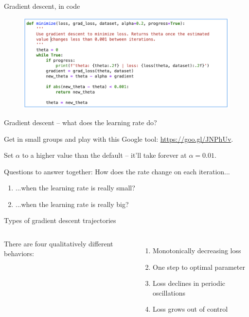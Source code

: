 \documentclass[aspectratio=169]{beamer}
\begin{document}
\begin{frame}{Gradient descent, in code}

%
%
%

\begin{figure}
\includegraphics[width=1.\textwidth]{grad_desc}
\end{figure}

\end{frame}

\begin{frame}{Gradient descent -- what does the learning rate do?}

Get in small groups and play with this Google tool: \href{https://goo.gl/JNPhUv}{https://goo.gl/JNPhUv}.

\vspace{5mm}

Set $\alpha$ to a higher value than the default -- it'll take forever at $\alpha = 0.01$.  
\vspace{5mm}

Questions to answer together:  How does the rate change on each iteration...
\begin{enumerate}
\item ...when the learning rate is really small?
\item ...when the learning rate is really big?
\end{enumerate}

\end{frame}

\begin{frame}{Types of gradient descent trajectories}

\begin{columns}
There are four qualitatively different behaviors:
\begin{enumerate}
\item Monotonically decreasing loss
\item One step to optimal parameter
\item Loss declines in periodic oscillations
\item Loss grows out of control
\end{enumerate}


\end{columns}

\end{frame}
\end{document}
